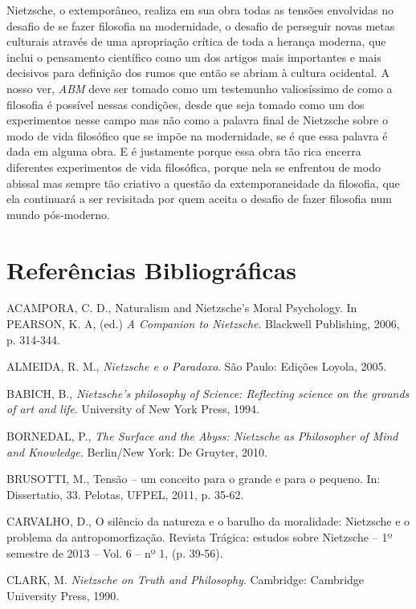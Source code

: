 \documentclass[
	12pt,				%
	openright,			%
	oneside,			%
	a4paper,			%
	english,			%
	french,				%
	spanish,			%
	brazil				%
	]{abntex2}
\begin{document}
	Nietzsche, o extemporâneo, realiza em sua obra todas as tensões envolvidas no desafio de se fazer filosofia na modernidade, o desafio de perseguir novas metas culturais através de uma apropriação crítica de toda a herança moderna, que inclui o pensamento científico como um dos artigos mais importantes e mais decisivos para definição dos rumos que então se abriam à cultura ocidental. A nosso ver, \textit{ABM} deve ser tomado como um testemunho valiosíssimo de como a filosofia é possível nessas condições, desde que seja tomado como um dos experimentos nesse campo mas não como a palavra final de Nietzsche sobre o modo de vida filosófico que se impõe na modernidade, se é que essa palavra é dada em alguma obra. E é justamente porque essa obra tão rica encerra diferentes experimentos de vida filosófica, porque nela se enfrentou de modo abissal mas sempre tão criativo a questão da extemporaneidade da filosofia, que ela continuará a ser revisitada por quem aceita o desafio de fazer filosofia num mundo pós-moderno.

\chapter*{Referências Bibliográficas}

\setlength{\parindent}{0cm}

ACAMPORA, C. D., Naturalism and Nietzsche's Moral Psychology. In PEARSON, K. A, (ed.) \textit{A Companion to Nietzsche}. Blackwell Publishing, 2006, p. 314-344.

ALMEIDA, R. M., \textit{Nietzsche e o Paradoxo}. São Paulo: Edições Loyola, 2005. 

BABICH, B., \textit{Nietzsche's philosophy of Science: Reflecting science on the grounds of art and life}. University of New York Press, 1994.

BORNEDAL, P., \textit{The Surface and the Abyss: Nietzsche as Philosopher of Mind and Knowledge.} Berlin/New York: De Gruyter, 2010.

BRUSOTTI, M., Tensão – um conceito para o grande e para o pequeno. In: Dissertatio, 33. Pelotas, UFPEL, 2011, p. 35-62.

CARVALHO, D., O silêncio da natureza e o barulho da moralidade: Nietzsche e o problema da antropomorfização. Revista Trágica: estudos sobre Nietzsche – 1º semestre de 2013 – Vol. 6 – nº 1, (p. 39-56).

CLARK, M. \textit{Nietzsche on Truth and Philosophy}. Cambridge: Cambridge University Press, 1990.
\end{document}
